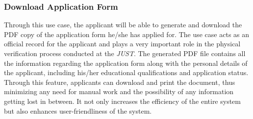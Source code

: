 \subsubsection{Download Application Form}

Through this use case, the applicant will be able to generate and download the PDF copy of the application form he/she has applied for. The use case acts as an official record for the applicant and plays a very important role in the physical verification process conducted at the \textit{JUST}. The generated PDF file contains all the information regarding the application form along with the personal details of the applicant, including his/her educational qualifications and application status. Through this feature, applicants can download and print the document, thus minimizing any need for manual work and the possibility of any information getting lost in between. It not only increases the efficiency of the entire system but also enhances user-friendliness of the system.

